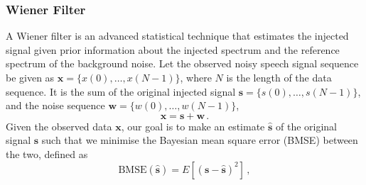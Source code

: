 \documentclass[paper-main.tex]{subfiles}
\begin{document}
\subsubsection{Wiener Filter}

A Wiener filter is an advanced statistical technique that estimates the injected signal given prior information about the injected spectrum and the reference spectrum of the background noise. Let the observed noisy speech signal sequence be given as $\mathbf{x}=\{x(0),\dots, x(N-1)\}$, where $N$ is the length of the data sequence. It is the sum of the original injected signal $\mathbf{s}=\{s(0),\dots,s(N-1)\}$, and the noise sequence $\mathbf{w}=\{w(0),\dots,w(N-1)\}$, 
\begin{equation}
    \mathbf{x}=\mathbf{s}+\mathbf{w}\,.
\end{equation}
Given the observed data $\textbf{x}$, our goal is to make an estimate $\hat{\textbf{s}}$ of the original signal $\textbf{s}$ such that we minimise the Bayesian mean square error (BMSE) between the two, defined as 
\begin{equation}
\label{eq:BMSE}
\text{BMSE}(\hat{\textbf{s}})=E[(\textbf{s}-\hat{\textbf{s}})^2]\,,
\end{equation}
\end{document}
